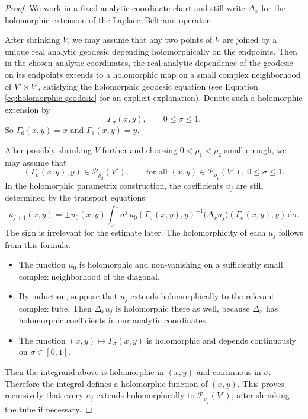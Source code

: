 \documentclass[11pt]{amsart}
\theoremstyle{plain}
\theoremstyle{definition}
\newcommand{\dd}{\mathrm d}
\begin{document}
\begin{proof}
We work in a fixed analytic coordinate chart and still write $\Delta_x$ for the holomorphic extension of the Laplace--Beltrami operator.  

After shrinking $V$, we may assume that any two points of $V$ are joined by a unique real analytic geodesic depending holomorphically on the endpoints. 
Then in the chosen analytic coordinates,
the real analytic dependence of the geodesic on its endpoints extends to a
holomorphic map on a small complex
neighborhood of $V'\times V'$, satisfying the holomorphic geodesic equation (see Equation \eqref{eq:holomorphic-geodesic} for an explicit explanation). Denote such a holomorphic extension by
\[
\Gamma_\sigma(x,y),
\qquad
0\le \sigma\le 1.
\]
So $\Gamma_0(x,y)=x$ and $\Gamma_1(x,y)=y$. 

After possibly shrinking $V$ further and choosing $0<\rho_1<\rho_2$
small enough, we may assume that
\[
(\Gamma_\sigma(x,y),y)\in \mathcal P_{\rho_2}(V'),\qquad\text{for all }(x,y)\in \mathcal P_{\rho_1}(V'),~0\le \sigma\le 1.
\]
In the holomorphic parametrix construction, the coefficients $u_j$
are still determined by the transport equations 
\[
u_{j+1}(x,y)=\pm u_0(x,y)
\int_0^1\sigma^j\,
u_0(\Gamma_\sigma(x,y),y)^{-1}
\bigl(\Delta_x u_j\bigr)(\Gamma_\sigma(x,y),y)
\,\dd\sigma .
\]
The sign is irrelevant for the estimate later. The holomorphicity of each $u_j$ follows from this formula:  
\begin{itemize}
    \item The function $u_0$ is
holomorphic and non-vanishing on a sufficiently small complex
neighborhood of the diagonal.
    \item By induction, suppose that $u_j$
extends holomorphically to the relevant complex tube.  Then
$\Delta_xu_j$ is holomorphic there as well, because $\Delta_x$ has holomorphic coefficients in our analytic coordinates.  
   \item The function $(x,y)\mapsto \Gamma_\sigma(x,y)$ is holomorphic and depends
continuously on $\sigma\in[0,1]$.
\end{itemize}
Then the integrand above is holomorphic
in $(x,y)$ and continuous in $\sigma$.  Therefore the integral
defines a holomorphic function of $(x,y)$.  This proves recursively
that every $u_j$ extends holomorphically to
$\mathcal P_{\rho_2}(V')$, after shrinking the tube if necessary.


\end{proof}
\end{document}
